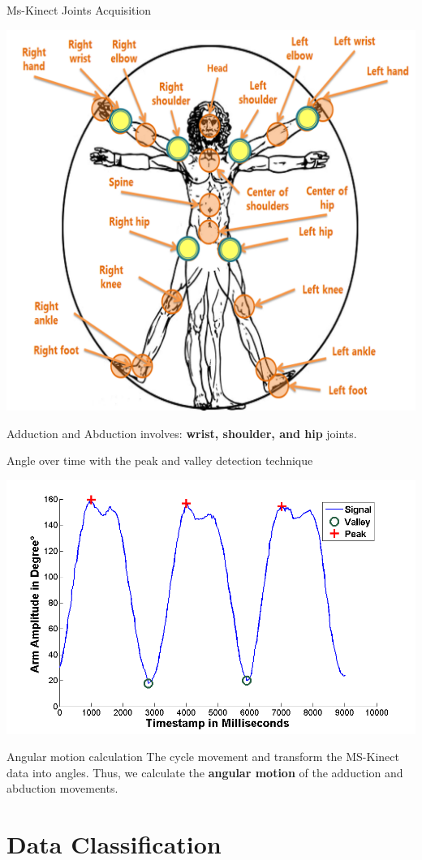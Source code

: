 \documentclass{beamer}
\begin{document}
\begin{frame}{Ms-Kinect Joints Acquisition}
  \begin{block}{}
      \center \includegraphics[height=2.5 in]{img/articulacoes-sel.png}
  \end{block}
	
	\begin{block}{}
	Adduction and Abduction involves: \textbf{wrist, shoulder, and hip} joints.
	\end{block}	
\end{frame}



\begin{frame}{Angle over time with the peak and valley detection technique}
  \begin{block}{}
      \center 
      \includegraphics[height=1.6 in]{img/signalamplitudepeakvaley-2.png}
  \end{block}
	
	\begin{block}{Angular motion calculation}
	The cycle movement and transform the MS-Kinect data into angles. Thus, we calculate the \textbf{angular motion} of the adduction and abduction movements.
	\end{block}
\end{frame}

\section{Data Classification}
%
%
\end{document}
